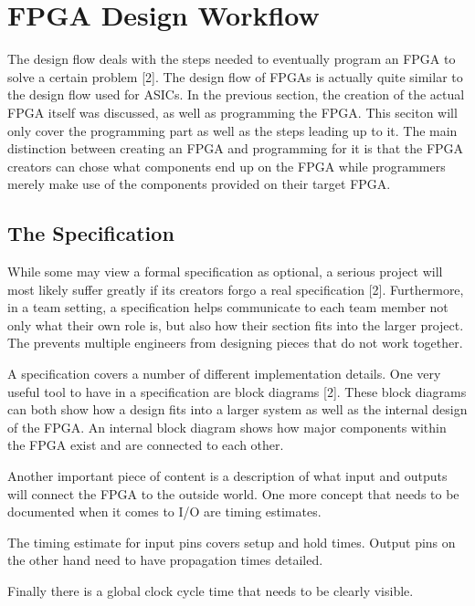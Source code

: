 \documentclass{article}
\begin{document}
    
    \section{FPGA Design Workflow}

    The design flow deals with the steps needed to eventually program an FPGA
    to solve a certain problem [2]. The design flow of FPGAs is actually quite
    similar to the design flow used for ASICs.
    In the previous section, the creation of the actual FPGA itself was discussed,
    as well as programming the FPGA. This seciton will only cover the programming
    part as well as the steps leading up to it.
    The main distinction between creating an FPGA and programming for it is that
    the FPGA creators can chose what components end up on the FPGA while programmers
    merely make use of the components provided on their target FPGA.

    \subsection{The Specification}

    While some may view a formal specification as optional, a serious project
    will most likely suffer greatly if its creators forgo a real specification [2].
    Furthermore, in a team setting, a specification helps communicate to each team
    member not only what their own role is, but also how their section fits into the
    larger project. The prevents multiple engineers from designing pieces that
    do not work together.

    A specification covers a number of different implementation details.
    One very useful tool to have in a specification are block diagrams [2].
    These block diagrams can both show how a design fits into a larger system
    as well as the internal design of the FPGA. An internal block diagram shows
    how major components within the FPGA exist and are connected to each other.

    Another important piece of content is a description of what input and outputs
    will connect the FPGA to the outside world. One more concept that
    needs to be documented when it comes to I/O are timing estimates.

    The timing estimate for input pins covers setup and hold times.
    Output pins on the other hand need to have propagation times detailed.

    Finally there is a global clock cycle time that needs to be clearly visible.
\end{document}
